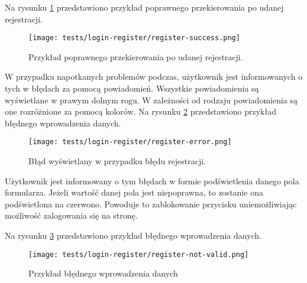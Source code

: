 Na rysunku \ref{success_register} przedstawiono przykład poprawnego przekierowania po udanej rejestracji.
\begin{figure}[H]
  \centering
  \texttt{[image: tests/login-register/register-success.png]}
  \caption{Przykład poprawnego przekierowania po udanej rejestracji.}
  \label{success_register}
\end{figure}
W przypadku napotkanych problemów podczas, użytkownik jest informowanych o tych w błędach za pomocą powiadomień. Wszystkie powiadomienia są wyświetlane w prawym dolnym rogu. W zależności od rodzaju powiadomienia są one rozróżnione za pomocą kolorów. Na rysunku \ref{register_error} przedstawiono przykład błędnego wprowadzenia danych.
\begin{figure}[H]
  \centering
  \texttt{[image: tests/login-register/register-error.png]}
  \caption{Błąd wyświetlany w przypadku błędu rejestracji.}
  \label{register_error}
\end{figure}
Użytkownik jest informowany o tym błędach w formie podświetlenia danego pola formularza. Jeżeli wartość danej pola jest niepoprawna, to zostanie ona podświetlona na czerwono. Powoduje to zablokowanie przycisku uniemożliwiając możliwość zalogowania się na stronę.

Na rysunku \ref{login_error} przedstawiono przykład błędnego wprowadzenia danych.
\begin{figure}[H]
  \centering
  \texttt{[image: tests/login-register/register-not-valid.png]}
  \caption{Przykład błędnego wprowadzenia danych}
  \label{login_error}
\end{figure}

